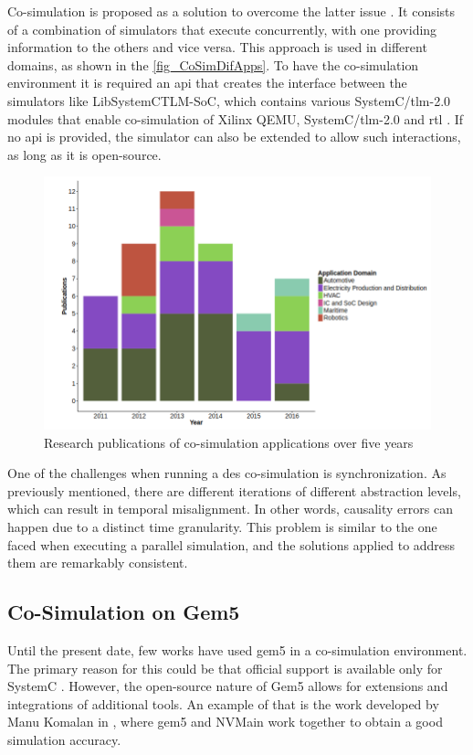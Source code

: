 Co-simulation is proposed as a solution to overcome the latter issue \cite{gomes2017co}. It consists of a combination of simulators that 
execute concurrently, with one providing information to the others and vice versa. This approach is used in different domains, as shown in 
the \autoref{fig_CoSimDifApps}. To have the co-simulation environment it is required an \gls{api} that creates the interface between the 
simulators like LibSystemCTLM-SoC, which contains various SystemC/\gls{tlm}-2.0 modules that enable co-simulation of Xilinx QEMU, 
SystemC/\gls{tlm}-2.0 and \gls{rtl} \cite{XilinxLibsystemctlm-SOC}. If no \gls{api} is provided, the simulator can also be extended to allow 
such interactions, as long
as it is open-source.

\begin{figure}[]
	\centering
 	\includegraphics[width=0.6\linewidth]{Images/CoSimDifApps.png}
 	\caption{Research publications of co-simulation applications over five years\cite{gomes2017co}}
	 \label{fig_CoSimDifApps}
\end{figure}

One of the challenges when running a \gls{des} co-simulation is synchronization. As previously mentioned, there are different 
iterations of different abstraction levels, which can result in temporal misalignment. In other words, causality errors can happen due to a 
distinct time granularity. This problem is similar to the one faced when executing a parallel simulation, and the solutions applied to address 
them are remarkably consistent. 


\subsection{Co-Simulation on Gem5}

Until the present date, few works have used gem5 in a co-simulation environment. The primary reason for this could be that official 
support is available only for SystemC \cite{Thegem5simulatorV2}. However, the open-source nature of Gem5 allows for extensions and 
integrations of additional tools. An example of that is the work developed by Manu Komalan in \cite{komalan2018main}, where gem5 and NVMain 
work together to obtain a good simulation accuracy.

